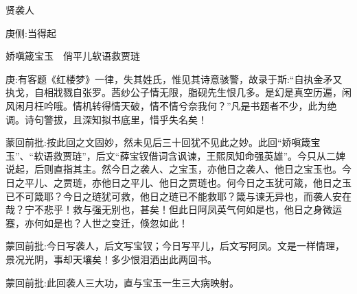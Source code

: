 

\begin{parag}
    贤袭人\begin{note}庚侧:当得起\end{note}娇嗔箴宝玉　俏平儿软语救贾琏
\end{parag}

\begin{parag}
    \begin{note}庚:有客题《红楼梦》一律，失其姓氏，惟见其诗意骇警，故录于斯:“自执金矛又执戈，自相戕戮自张罗。茜纱公子情无限，脂砚先生恨几多。是幻是真空历遍，闲风闲月枉吟哦。情机转得情天破，情不情兮奈我何？”凡是书题者不少，此为绝调。诗句警拔，且深知拟书底里，惜乎失名矣！\end{note}
\end{parag}


\begin{parag}
    \begin{note}蒙回前批:按此回之文固妙，然未见后三十回犹不见此之妙。此回“娇嗔箴宝玉”、“软语救贾琏”，后文“薛宝钗借词含讽谏，王熙凤知命强英雄”。今只从二婢说起，后则直指其主。然今日之袭人、之宝玉，亦他日之袭人、他日之宝玉也。今日之平儿、之贾琏，亦他日之平儿、他日之贾琏也。何今日之玉犹可箴，他日之玉已不可箴耶？今日之琏犹可救，他日之琏已不能救耶？箴与谏无异也，而袭人安在哉？宁不悲乎！救与强无别也，甚矣！但此日阿凤英气何如是也，他日之身微运蹇，亦何如是也？人世之变迁，倏忽如此！\end{note}
\end{parag}


\begin{parag}
    \begin{note}蒙回前批:今日写袭人，后文写宝钗；今日写平儿，后文写阿凤。文是一样情理，景况光阴，事却天壤矣！多少恨泪洒出此两回书。\end{note}
\end{parag}


\begin{parag}
    \begin{note}蒙回前批:此回袭人三大功，直与宝玉一生三大病映射。\end{note}
\end{parag}


